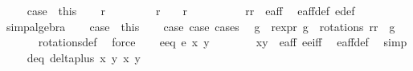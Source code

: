 \begin{isabellebody}
\isanewline
\ \ \isamarkupfalse%
\ case{}\ {\isacharequal}\ this\isanewline
\ \ \isacommand{{\isacharbraceleft}}\isamarkupfalse%
\isamarkupfalse%
\ {\isachardoublequoteopen}r{}\ {\isacharequal}\ {}{\isachardoublequoteclose}\ \isanewline
\ \ \isamarkupfalse%
\ \isamarkupfalse%
\ {\isachardoublequoteopen}r{}\ {\isacharequal}\ {}\ {\isasymor}\ r{}\ {\isacharequal}\ {\isacharminus}{}{\isachardoublequoteclose}\isanewline
\ \ \ \ \ \ \isamarkupfalse%
\ {\isacartoucheopen}{\isacharparenleft}r{}{\isacharcomma}r{}{\isacharparenright}\ {\isasymin}\ e{\isacharunderscore}aff{\isacartoucheclose}\ \isamarkupfalse%
\ e{\isacharunderscore}aff{\isacharunderscore}def\ e{\isacharprime}{\isacharunderscore}def\ \isanewline
\ \ \ \ \ \ \isamarkupfalse%
{\isacharparenleft}simp{\isacharcomma}algebra{\isacharparenright}\isacommand{{\isacharbraceright}}\isamarkupfalse%
\isanewline
\ \ \isamarkupfalse%
\ case{}\ {\isacharequal}\ this\isanewline
\ \ \isamarkupfalse%
\ case{}\ case{}\ cases\ \isamarkupfalse%
\ g\ \ r{\isacharunderscore}expr{\isacharcolon}\ {\isachardoublequoteopen}g\ {\isasymin}\ rotations{\isachardoublequoteclose}\ {\isachardoublequoteopen}{\isacharparenleft}r{}{\isacharcomma}r{}{\isacharparenright}\ {\isacharequal}\ g\ {\isacharparenleft}{}{\isacharcomma}{}{\isacharparenright}{\isachardoublequoteclose}\isanewline
\ \ \ \ \isamarkupfalse%
\ rotations{\isacharunderscore}def\ \isamarkupfalse%
\ force\isanewline
\isanewline
\ \ \isamarkupfalse%
\ e{\isacharunderscore}eq{\isacharcolon}\ {\isachardoublequoteopen}e\ x\ y\ {\isacharequal}\ {}{\isachardoublequoteclose}\isanewline
\ \ \ \ \isamarkupfalse%
\ {\isacartoucheopen}{\isacharparenleft}x{\isacharcomma}y{\isacharparenright}\ {\isasymin}\ e{\isacharunderscore}aff{\isacartoucheclose}\ e{\isacharunderscore}e{\isacharprime}{\isacharunderscore}iff\ \isamarkupfalse%
\ e{\isacharunderscore}aff{\isacharunderscore}def\ \isamarkupfalse%
\ simp\isanewline
\ \ \isamarkupfalse%
\ d{\isacharunderscore}eq{\isacharcolon}\ {\isachardoublequoteopen}delta{\isacharunderscore}plus\ x\ y\ x\ y\ {\isasymnoteq}\ {}{\isachardoublequoteclose}\isanewline

\end{isabellebody}
